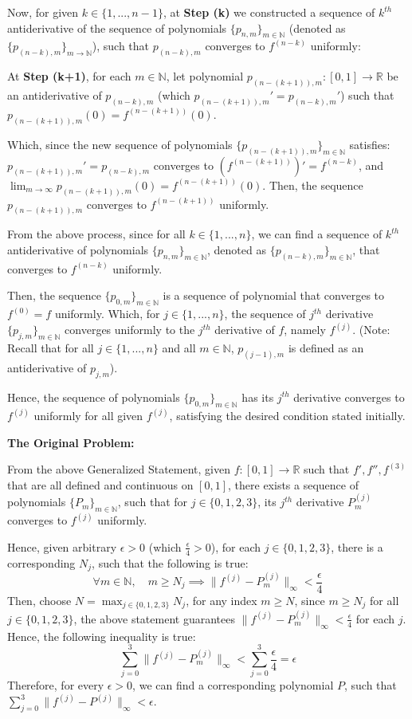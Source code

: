 \documentclass{article}
\begin{document}
\hfill

Now, for given $k\in\{1,...,n-1\}$, at \textbf{Step (k)} we constructed a sequence of $k^{th}$ antiderivative of the sequence of polynomials $\{p_{n,m}\}_{m\in\mathbb{N}}$ (denoted as $\{p_{(n-k),m}\}_{m\rightarrow\mathbb{N}}$), such that $p_{(n-k),m}$ converges to $f^{(n-k)}$ uniformly:

At \textbf{Step (k+1)}, for each $m\in\mathbb{N}$, let polynomial $p_{(n-(k+1)),m}:[0,1]\rightarrow\mathbb{R}$ be an antiderivative of $p_{(n-k),m}$ (which $p_{(n-(k+1)),m}' = p_{(n-k),m}'$) such that $p_{(n-(k+1)),m}(0) = f^{(n-(k+1))}(0)$.

Which, since the new sequence of polynomials $\{p_{(n-(k+1)),m}\}_{m\in\mathbb{N}}$ satisfies: $p_{(n-(k+1)),m}'=p_{(n-k),m}$ converges to $(f^{(n-(k+1))})'=f^{(n-k)}$,
and $\lim_{m\rightarrow\infty}p_{(n-(k+1)),m}(0)=f^{(n-(k+1))}(0)$. Then, the sequence $p_{(n-(k+1)),m}$ converges to $f^{(n-(k+1))}$ uniformly.

\hfill

From the above process, since for all $k\in \{1,...,n\}$, we can find a sequence of $k^{th}$ antiderivative of polynomials $\{p_{n,m}\}_{m\in\mathbb{N}}$, denoted as $\{p_{(n-k),m}\}_{m\in\mathbb{N}}$, that converges to $f^{(n-k)}$ uniformly. 

Then, the sequence $\{p_{0,m}\}_{m\in\mathbb{N}}$ is a sequence of polynomial that converges to $f^{(0)}=f$ uniformly. Which, for $j\in\{1,...,n\}$, the sequence of $j^{th}$ derivative $\{p_{j,m}\}_{m\in\mathbb{N}}$ converges uniformly to the $j^{th}$ derivative of $f$, namely $f^{(j)}$.
(Note: Recall that for all $j\in\{1,...,n\}$ and all $m\in\mathbb{N}$, $p_{(j-1),m}$ is defined as an antiderivative of $p_{j,m}$).

Hence, the sequence of polynomials $\{p_{0,m}\}_{m\in\mathbb{N}}$ has its $j^{th}$ derivative converges to $f^{(j)}$ uniformly for all given $f^{(j)}$, satisfying the desired condition stated initially.

\hfill

\textbf{The Original Problem:}

From the above Generalized Statement, given $f:[0,1]\rightarrow\mathbb{R}$ such that $f',f'',f^{(3)}$ that are all defined and continuous on $[0,1]$, there exists a sequence of polynomials $\{P_m\}_{m\in\mathbb{N}}$, 
such that for $j\in\{0,1,2,3\}$, its $j^{th}$ derivative $P_m^{(j)}$ converges to $f^{(j)}$ uniformly.

Hence, given arbitrary $\epsilon>0$ (which $\frac{\epsilon}{4}>0$), for each $j\in\{0,1,2,3\}$, there is a corresponding $N_j$, such that the following is true:
$$\forall m\in\mathbb{N},\quad m\geq N_j \implies \|f^{(j)}-P_m^{(j)}\|_\infty <\frac{\epsilon}{4}$$
Then, choose $N = \max_{j\in\{0,1,2,3\}}N_j$, for any index $m\geq N$, since $m\geq N_j$ for all $j\in\{0,1,2,3\}$, the above statement guarantees $\|f^{(j)}-P_m^{(j)}\|_\infty <\frac{\epsilon}{4}$ for each $j$.
Hence, the following inequality is true:
$$\sum_{j=0}^{3}\|f^{(j)}-P_m^{(j)}\|_\infty < \sum_{j=0}^{3}\frac{\epsilon}{4}=\epsilon$$
Therefore, for every $\epsilon>0$, we can find a corresponding polynomial $P$, such that $\sum_{j=0}^{3}\|f^{(j)}-P^{(j)}\|_\infty<\epsilon$.
\end{document}
